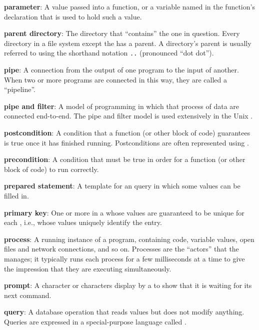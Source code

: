 \documentclass{book}
\begin{document}
\textbf{parameter}: A value passed into a function, or a variable named
in the function's declaration that is used to hold such a value.

\textbf{parent directory}: The directory that ``contains'' the one in
question. Every directory in a file system except the
 has a parent. A directory's
parent is usually referred to using the shorthand notation \texttt{..}
(pronounced ``dot dot'').

\textbf{pipe}: A connection from the output of one program to the input
of another. When two or more programs are connected in this way, they
are called a ``pipeline''.

\textbf{pipe and filter}: A model of programming in which
 that process 
of data are connected end-to-end. The pipe and filter model is used
extensively in the Unix .

\textbf{postcondition}: A condition that a function (or other block of
code) guarantees is true once it has finished running. Postconditions
are often represented using .

\textbf{precondition}: A condition that must be true in order for a
function (or other block of code) to run correctly.

\textbf{prepared statement}: A template for an 
query in which some values can be filled in.

\textbf{primary key}: One or more  in
a  whose values are
guaranteed to be unique for each ,
i.e., whose values uniquely identify the entry.

\textbf{process}: A running instance of a program, containing code,
variable values, open files and network connections, and so on.
Processes are the ``actors'' that the
 manages; it typically
runs each process for a few milliseconds at a time to give the
impression that they are executing simultaneously.

\textbf{prompt}: A character or characters display by a
 to show that it is waiting for its next command.

\textbf{query}: A database operation that reads values but does not
modify anything. Queries are expressed in a special-purpose language
called .
\end{document}
